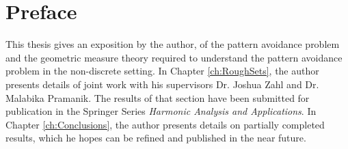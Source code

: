 
\chapter{Preface}

This thesis gives an exposition by the author, of the pattern avoidance problem and the geometric measure theory required to understand the pattern avoidance problem in the non-discrete setting. In Chapter \ref{ch:RoughSets}, the author presents details of joint work with his supervisors Dr. Joshua Zahl and Dr. Malabika Pramanik. The results of that section have been submitted for publication in the Springer Series \emph{Harmonic Analysis and Applications}. In Chapter \ref{ch:Conclusions}, the author presents details on partially completed results, which he hopes can be refined and published in the near future.